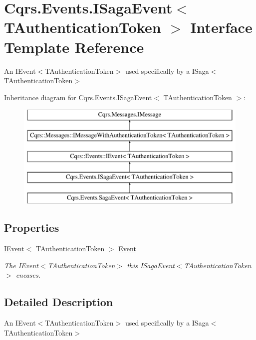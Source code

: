 \hypertarget{interfaceCqrs_1_1Events_1_1ISagaEvent}{}\section{Cqrs.\+Events.\+I\+Saga\+Event$<$ T\+Authentication\+Token $>$ Interface Template Reference}
\label{interfaceCqrs_1_1Events_1_1ISagaEvent}


An I\+Event$<$\+T\+Authentication\+Token$>$ used specifically by a I\+Saga$<$\+T\+Authentication\+Token$>$  


Inheritance diagram for Cqrs.\+Events.\+I\+Saga\+Event$<$ T\+Authentication\+Token $>$\+:\begin{figure}[H]
\begin{center}
\leavevmode
\includegraphics[height=5.000000cm]{interfaceCqrs_1_1Events_1_1ISagaEvent}
\end{center}
\end{figure}
\subsection*{Properties}
\begin{DoxyCompactItemize}
\item 
\hyperlink{interfaceCqrs_1_1Events_1_1IEvent}{I\+Event}$<$ T\+Authentication\+Token $>$ \hyperlink{interfaceCqrs_1_1Events_1_1ISagaEvent_adc0c41f6a64cadb56d758093c02ef266_adc0c41f6a64cadb56d758093c02ef266}{Event}
\begin{DoxyCompactList}\small\item\em The I\+Event$<$\+T\+Authentication\+Token$>$ this I\+Saga\+Event$<$\+T\+Authentication\+Token$>$ encases. \end{DoxyCompactList}\end{DoxyCompactItemize}


\subsection{Detailed Description}
An I\+Event$<$\+T\+Authentication\+Token$>$ used specifically by a I\+Saga$<$\+T\+Authentication\+Token$>$ 


